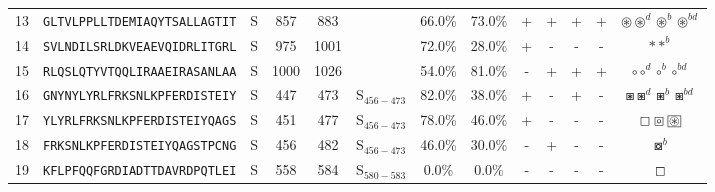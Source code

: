 \begin{tabular}{rcccccccccccc}
13 &  \texttt{GLTVLPPLLTDEMIAQYTSALLAGTIT} &       S &    857 &   883 &                &                          66.0\% &                           73.0\% &          + &           + &          + &           + &                                                                                   $ \circledast \circledast^d \circledast^b \circledast^{bd} $ \\
14 &  \texttt{SVLNDILSRLDKVEAEVQIDRLITGRL} &       S &    975 &  1001 &                &                          72.0\% &                           28.0\% &          + &           - &          - &           - &                                                                                                                                $ \ast \ast^b $ \\
15 &  \texttt{RLQSLQTYVTQQLIRAAEIRASANLAA} &       S &   1000 &  1026 &                &                          54.0\% &                           81.0\% &          - &           + &          + &           + &                                                                                                           $ \circ \circ^d \circ^b \circ^{bd} $ \\
16 &  \texttt{GNYNYLYRLFRKSNLKPFERDISTEIY} &       S &    447 &   473 &  S$_{456-473}$ &                          82.0\% &                           38.0\% &          + &           - &          + &           - &                                                                                                   $ \boxast \boxast^d \boxast^b \boxast^{bd} $ \\
17 &  \texttt{YLYRLFRKSNLKPFERDISTEIYQAGS} &       S &    451 &   477 &  S$_{456-473}$ &                          78.0\% &                           46.0\% &          + &           - &          - &           - &                                                                       $ \boxempty \boxcircle \setlength{\fboxsep}{0.5pt} \boxed{\circledast} $ \\
18 &  \texttt{FRKSNLKPFERDISTEIYQAGSTPCNG} &       S &    456 &   482 &  S$_{456-473}$ &                          46.0\% &                           30.0\% &          - &           + &          - &           - &                                                                                                                               $ \boxcircle^b $ \\
19 &  \texttt{KFLPFQQFGRDIADTTDAVRDPQTLEI} &       S &    558 &   584 &  S$_{580-583}$ &                           0.0\% &                            0.0\% &          - &           - &          - &           - &                                                                                                                                  $ \boxempty $ \\

\end{tabular}
